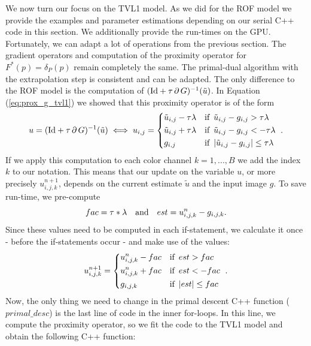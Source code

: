 \documentclass[abstracton]{scrreprt}
\begin{document}
        We now turn our focus on the TVL1 model. As we did for the ROF model we provide the examples and parameter estimations depending on our serial C++ code in this section. We additionally provide the run-times on the GPU. Fortunately, we can adapt a lot of operations from the previous section. The gradient operators and computation of the proximity operator for $F^{\ast}(p) = \delta_{P}(p)$ remain completely the same. The primal-dual algorithm with the extrapolation step is consistent and can be adapted. The only difference to the ROF model is the computation of $(\textnormal{Id} + \tau\,\partial\,G)^{-1}(\tilde{u})$. In Equation (\ref{eq:prox_g_tvl1}) we showed that this proximity operator is of the form
            $$
                u = (\textnormal{Id} + \tau\,\partial\,G)^{-1}(\tilde{u}) \iff u_{i, j} = 
                    \begin{dcases*}
                        \tilde{u}_{i,j} - \tau\lambda & \textnormal{if\, $\tilde{u}_{i,j} - g_{i,j} > \tau\lambda$} \\
                        \tilde{u}_{i,j} + \tau\lambda & \textnormal{if\, $\tilde{u}_{i,j} - g_{i,j} < - \tau\lambda$} \\
                        g_{i, j} & \textnormal{if\, $|\tilde{u}_{i,j} - g_{i,j}| \le \tau\lambda$}
                    \end{dcases*}.
            $$
        If we apply this computation to each color channel $k = 1, ..., B$ we add the index $k$ to our notation. This means that our update on the variable $u$, or more precisely $u^{n+1}_{i,j,k}$, depends on the current estimate $\tilde{u}$ and the input image $g$. To save run-time, we pre-compute
            $$
                fac = \tau * \lambda \,\,\,\,\,\, \textnormal{and} \,\,\,\,\,\, est = u^{n}_{i,j,k} - g_{i,j,k}.
            $$
        Since these values need to be computed in each if-statement, we calculate it once - before the if-statements occur - and make use of the values:
            $$
                u^{n+1}_{i,j,k} = 
                    \begin{dcases*}
                        u^{n}_{i,j,k} - fac & \textnormal{if\, $est > fac$} \\
                        u^{n}_{i,j,k} + fac & \textnormal{if\, $est < - fac$} \\
                        g_{i,j,k} & \textnormal{if\, $|est| \le fac$}
                    \end{dcases*}.
            $$
        Now, the only thing we need to change in the primal descent C++ function ($primal\_desc$) is the last line of code in the inner for-loops. In this line, we compute the proximity operator, so we fit the code to the TVL1 model and obtain the following C++ function:
\end{document}
